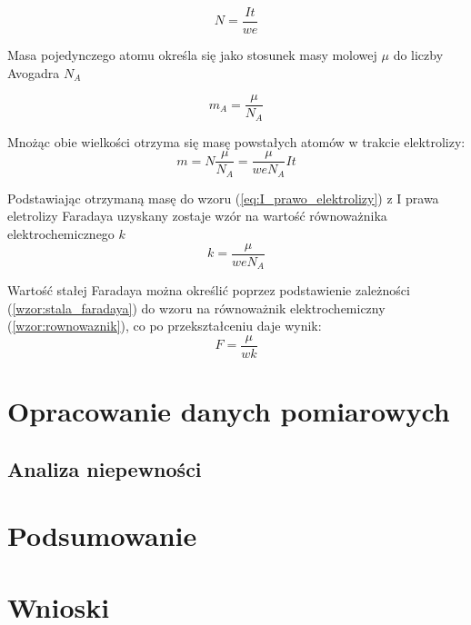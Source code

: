 \documentclass[a4paper,12pts]{article}
\begin{document}
	\begin{equation}
		N = \frac{It}{we}
	\end{equation}
	
	Masa pojedynczego atomu określa się jako stosunek masy molowej $\mu$ do liczby Avogadra $N_A$
	
	\begin{equation}
		m_A = \frac{\mu}{N_A}
	\end{equation}
	
	Mnożąc obie wielkości otrzyma się masę powstałych atomów w trakcie elektrolizy:
	\begin{equation}
		m = N \frac{\mu}{N_A} = \frac{\mu}{weN_A} It
	\end{equation}
	
	Podstawiając otrzymaną masę do wzoru (\ref{eq:I_prawo_elektrolizy}) z I prawa eletrolizy Faradaya uzyskany zostaje wzór na wartość równoważnika elektrochemicznego $k$
	\begin{equation}
		k = \frac{\mu}{weN_A}
		\label{wzor:rownowaznik}
	\end{equation}
	
	Wartość stałej Faradaya można określić poprzez podstawienie zależności (\ref{wzor:stala_faradaya}) do wzoru na równoważnik elektrochemiczny (\ref{wzor:rownowaznik}), co po przekształceniu daje wynik:
	\begin{equation}
		F = \frac{\mu}{wk}
	\end{equation}
	
	
	\section{Opracowanie danych pomiarowych}
	
	
	\subsection{Analiza niepewności}
	

	\section{Podsumowanie}

	
	\section{Wnioski}
\end{document}
